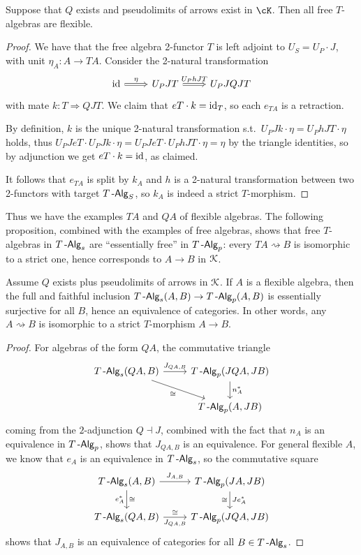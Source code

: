 \documentclass[a4paper,11pt,oneside,openany]{scrbook}
\begin{document}
\begin{thm}
    Suppose that $Q$ exists and pseudolimits of arrows exist in $\cK$. Then all
    free $T$-algebras are flexible.
\end{thm}
\begin{proof}
    We have that the free algebra 2-functor $T$ is left adjoint to $U_S=U_P\cdot
    J$, with unit $\eta_A\colon A\rightarrow TA$. Consider the 2-natural
    transformation
    \[\begin{tikzcd}
        {\id} & {U_PJT} & {U_PJQJT}
        \arrow["{U_PhJT}", Rightarrow, from=1-2, to=1-3]
        \arrow["\eta", Rightarrow, from=1-1, to=1-2]
    \end{tikzcd}\]
    with mate $k\colon T\Rightarrow QJT$. We claim that $eT\cdot k=\operatorname{id}_T$, so
    each $e_{TA}$ is a retraction.

    By definition, $k$ is the unique 2-natural transformation s.t.\
    $U_PJk\cdot\eta=U_PhJT\cdot\eta$ holds, thus $U_PJeT\cdot
    U_PJk\cdot\eta=U_PJeT\cdot U_PhJT\cdot\eta=\eta$ by the triangle identities,
    so by adjunction we get $eT\cdot k=\operatorname{id}$, as claimed.

    It follows that $e_{TA}$ is split by $k_A$ and $h$ is a 2-natural
    transformation between two 2-functors with target $T\operatorname{-\mathsf{Alg}}_S$, so $k_A$ is
    indeed a strict $T$-morphism.
\end{proof}
\noindent Thus we have the examples $TA$ and $QA$ of flexible algebras. The following proposition, combined with the examples of free algebras, shows that free $T$-algebras in $T\operatorname{-\mathsf{Alg}}_s$ are ``essentially free'' in $T\operatorname{-\mathsf{Alg}}_p$: every $TA\rightsquigarrow B$ is isomorphic to a strict one, hence corresponds to $A\to B$ in $\operatorname{\mathcal{K}}$.
\begin{prop}
Assume $Q$ exists plus pseudolimits of arrows in $\operatorname{\mathcal{K}}$. If $A$ is a flexible algebra, then the full and faithful inclusion $T\operatorname{-\mathsf{Alg}}_s(A,B)\to T\operatorname{-\mathsf{Alg}}_p(A,B)$ is essentially surjective for all $B$, hence an equivalence of categories. In other words, any $A\rightsquigarrow B$ is isomorphic to a strict $T$-morphism $A\to B$.
\end{prop}
\begin{proof}
 For algebras of the form $QA$, the commutative triangle   
 \[\begin{tikzcd}
{T\Alg_s(QA,B)} \arrow[r, "{J_{QA,B}}"] \arrow[rd, "\cong"'] & {T\Alg_p(JQA,JB)} \arrow[d, "n_A^*"] \\
                                                             & {T\Alg_p(A,JB)}                        
\end{tikzcd}\]
coming from the $2$-adjunction $Q\dashv J$, combined with the fact that $n_A$ is an equivalence in $T\operatorname{-\mathsf{Alg}}_p$, shows that $J_{QA,B}$ is an equivalence. For general flexible $A$, we know that $e_A$ is an equivalence in $T\operatorname{-\mathsf{Alg}}_s$, so the commutative square 
\[\begin{tikzcd}
{T\Alg_s(A,B)} \arrow[r, "{J_{A,B}}"] \arrow[d, "e_A^*"', "\cong"] & {T\Alg_p(JA,JB)} \arrow[d, "Je_A^*", "\cong"'] \\
{T\Alg_s(QA,B)} \arrow[r, "{J_{QA,B}}"', "\cong"]                  & {T\Alg_p(JQA,JB)}                   
\end{tikzcd}\]
shows that $J_{A,B}$ is an equivalence of categories for all $B\in T\operatorname{-\mathsf{Alg}}_s$.
\end{proof}
\end{document}
